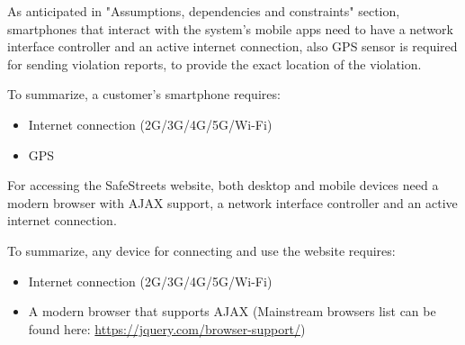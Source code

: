 As anticipated in "Assumptions, dependencies and constraints" section, smartphones that interact with the system's mobile apps need to have a network interface controller and an active internet connection, also GPS sensor is required for sending violation reports, to provide the exact location of the violation.

To summarize, a customer's smartphone requires:
\begin{itemize}
	\item Internet connection (2G/3G/4G/5G/Wi-Fi)
	\item GPS
\end{itemize}

For accessing the SafeStreets website, both desktop and mobile devices need a modern browser with AJAX support, a network interface controller and an active internet connection.

To summarize, any device for connecting and use the website requires:
\begin{itemize}
	\item Internet connection (2G/3G/4G/5G/Wi-Fi)
	\item A modern browser that supports AJAX (Mainstream browsers list can be found here: \url{https://jquery.com/browser-support/})
\end{itemize}